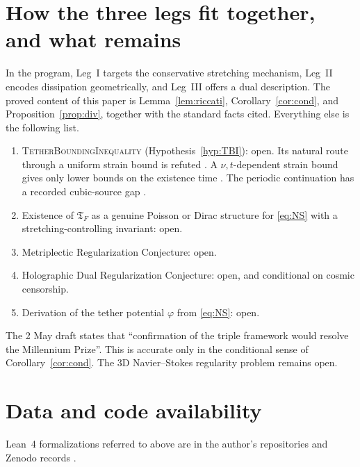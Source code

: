 \documentclass[11pt]{amsart}
\theoremstyle{definition}
\theoremstyle{remark}
\newcommand{\TF}{\mathfrak{T}_F}
\begin{document}
\section{How the three legs fit together, and what remains}
In the program, Leg~I targets the conservative stretching mechanism, Leg~II encodes dissipation geometrically, and Leg~III offers a dual description. The proved content of this paper is Lemma~\ref{lem:riccati}, Corollary~\ref{cor:cond}, and Proposition~\ref{prop:div}, together with the standard facts cited. Everything else is the following list.
\begin{enumerate}
\item \textsc{TetherBoundingInequality} (Hypothesis~\ref{hyp:TBI}): open. Its natural route through a uniform strain bound is refuted \cite{FrohmanStrain}. A $\nu,t$-dependent strain bound gives only lower bounds on the existence time \cite{FrohmanViscous}. The periodic continuation has a recorded cubic-source gap \cite{FrohmanCubic}.
\item Existence of $\TF$ as a genuine Poisson or Dirac structure for \eqref{eq:NS} with a stretching-controlling invariant: open.
\item Metriplectic Regularization Conjecture: open.
\item Holographic Dual Regularization Conjecture: open, and conditional on cosmic censorship.
\item Derivation of the tether potential $\varphi$ from \eqref{eq:NS}: open.
\end{enumerate}
The 2 May draft states that ``confirmation of the triple framework would resolve the Millennium Prize''. This is accurate only in the conditional sense of Corollary~\ref{cor:cond}. The 3D Navier--Stokes regularity problem remains open.

\section*{Data and code availability}
Lean~4 formalizations referred to above are in the author's repositories and Zenodo records \cite{FrohmanStrain,FrohmanCubic,FrohmanViscous,FrohmanTether,FrohmanCompanion}.
\end{document}
